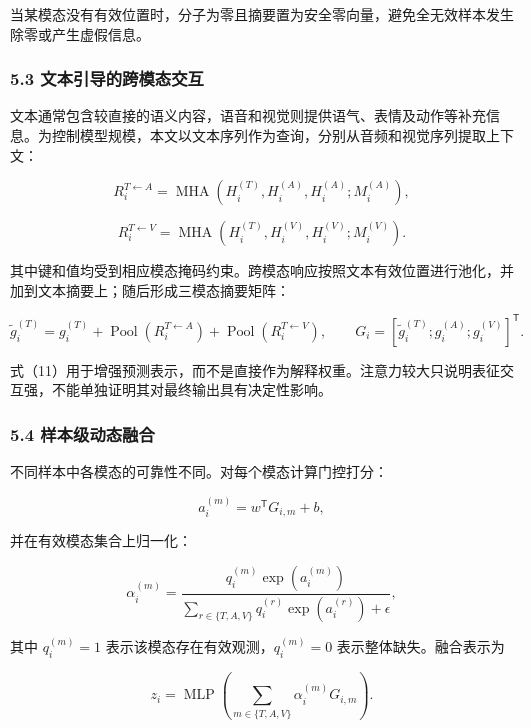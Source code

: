 \documentclass[
  12pt,
  a4paper,
]{ctexart}
\begin{document}
当某模态没有有效位置时，分子为零且摘要置为安全零向量，避免全无效样本发生除零或产生虚假信息。

\hypertarget{ux6587ux672cux5f15ux5bfcux7684ux8de8ux6a21ux6001ux4ea4ux4e92}{%
\subsubsection{5.3
文本引导的跨模态交互}\label{ux6587ux672cux5f15ux5bfcux7684ux8de8ux6a21ux6001ux4ea4ux4e92}}

文本通常包含较直接的语义内容，语音和视觉则提供语气、表情及动作等补充信息。为控制模型规模，本文以文本序列作为查询，分别从音频和视觉序列提取上下文：

\[
R_i^{T\leftarrow A}=\operatorname{MHA}\left(H_i^{(T)},H_i^{(A)},H_i^{(A)};M_i^{(A)}\right),
\tag{9}
\]

\[
R_i^{T\leftarrow V}=\operatorname{MHA}\left(H_i^{(T)},H_i^{(V)},H_i^{(V)};M_i^{(V)}\right).
\tag{10}
\]

其中键和值均受到相应模态掩码约束。跨模态响应按照文本有效位置进行池化，并加到文本摘要上；随后形成三模态摘要矩阵：

\[
\widetilde g_i^{(T)}=g_i^{(T)}+
\operatorname{Pool}\left(R_i^{T\leftarrow A}\right)+
\operatorname{Pool}\left(R_i^{T\leftarrow V}\right),
\qquad
G_i=\left[\widetilde g_i^{(T)};g_i^{(A)};g_i^{(V)}\right]^{\mathsf T}.
\tag{11}
\]

式（11）用于增强预测表示，而不是直接作为解释权重。注意力较大只说明表征交互强，不能单独证明其对最终输出具有决定性影响。

\hypertarget{ux6837ux672cux7ea7ux52a8ux6001ux878dux5408}{%
\subsubsection{5.4
样本级动态融合}\label{ux6837ux672cux7ea7ux52a8ux6001ux878dux5408}}

不同样本中各模态的可靠性不同。对每个模态计算门控打分：

\[
a_i^{(m)}=w^{\mathsf T}G_{i,m}+b,
\tag{12}
\]

并在有效模态集合上归一化：

\[
\alpha_i^{(m)}=
\frac{q_i^{(m)}\exp(a_i^{(m)})}
{\sum_{r\in\{T,A,V\}}q_i^{(r)}\exp(a_i^{(r)})+\epsilon},
\tag{13}
\]

其中 \(q_i^{(m)}=1\) 表示该模态存在有效观测，\(q_i^{(m)}=0\)
表示整体缺失。融合表示为

\[
z_i=\operatorname{MLP}\left(\sum_{m\in\{T,A,V\}}\alpha_i^{(m)}G_{i,m}\right).
\tag{14}
\]
\end{document}
